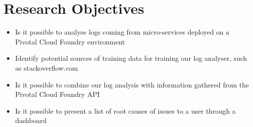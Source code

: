 \chapter{Research Objectives}

\begin{itemize}
  \item Is it possible to analyse logs coming from micro-services deployed on a Pivotal Cloud Foundry environment
  \item Identify potential sources of training data for training our log analyser, such as stackoverflow.com
  \item Is it possible to combine our log analysis with information gathered from the Pivotal Cloud Foundry API 
  \item Is it possible to present a list of root causes of issues to a user through a dashboard
\end{itemize}